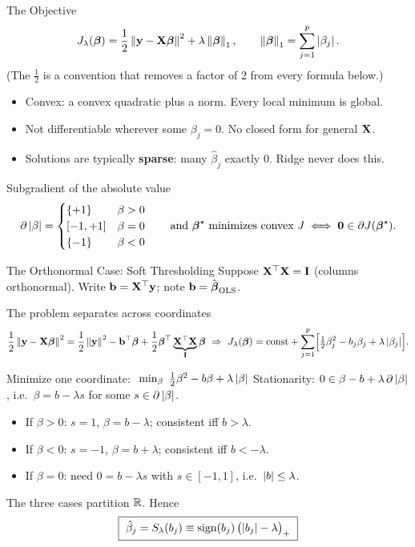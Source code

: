\documentclass[11pt,aspectratio=169]{beamer}
\begin{document}
\begin{frame}{The Objective}
\[
J_\lambda(\boldsymbol{\beta})=\frac12\left\lVert \mathbf{y}-\mathbf{X}\boldsymbol{\beta} \right\rVert^2+\lambda\left\lVert \boldsymbol{\beta} \right\rVert_1,\qquad\left\lVert \boldsymbol{\beta} \right\rVert_1=\sum_{j=1}^p\left\lvert \beta_j \right\rvert.
\]
(The $\tfrac12$ is a convention that removes a factor of 2 from every formula below.)
\begin{itemize}
  \item Convex: a convex quadratic plus a norm. Every local minimum is global.
  \item Not differentiable wherever some $\beta_j=0$. No closed form for general $\mathbf{X}$.
  \item Solutions are typically \textbf{sparse}: many $\hat\beta_j$ exactly $0$. Ridge never does this.
\end{itemize}
\begin{block}{Subgradient of the absolute value}
\[
\partial\left\lvert \beta \right\rvert=\begin{cases}\{+1\} & \beta>0\\ [-1,+1] & \beta=0\\ \{-1\} & \beta<0\end{cases}
\qquad\text{and }\boldsymbol{\beta}^\star\text{ minimizes convex }J\iff\mathbf{0}\in\partial J(\boldsymbol{\beta}^\star).
\]
\end{block}
\end{frame}

\begin{frame}{The Orthonormal Case: Soft Thresholding}\footnotesize
Suppose $\mathbf{X}^{\top}\mathbf{X}=\mathbf{I}$ (columns orthonormal). Write $\mathbf{b}=\mathbf{X}^{\top}\mathbf{y}$; note $\mathbf{b}=\hat{\boldsymbol{\beta}}_{\text{OLS}}$.
\begin{derivation}{The problem separates across coordinates}
\[
\frac12\left\lVert \mathbf{y}-\mathbf{X}\boldsymbol{\beta} \right\rVert^2=\frac12\left\lVert \mathbf{y} \right\rVert^2-\mathbf{b}^{\top}\boldsymbol{\beta}+\frac12\boldsymbol{\beta}^{\top}\underbrace{\mathbf{X}^{\top}\mathbf{X}}_{\mathbf{I}}\boldsymbol{\beta}
\ \Rightarrow\
J_\lambda(\boldsymbol{\beta})=\text{const}+\sum_{j=1}^p\Bigl[\tfrac12\beta_j^2-b_j\beta_j+\lambda\left\lvert \beta_j \right\rvert\Bigr].
\]
\end{derivation}
\begin{derivation}{Minimize one coordinate: $\ \min_\beta\ \tfrac12\beta^2-b\beta+\lambda\abs\beta$}
Stationarity: $0\in\beta-b+\lambda\,\partial\left\lvert \beta \right\rvert$, i.e.\ $\beta=b-\lambda s$ for some $s\in\partial\left\lvert \beta \right\rvert$.
\begin{itemize}
  \item If $\beta>0$: $s=1$, $\beta=b-\lambda$; consistent iff $b>\lambda$.
  \item If $\beta<0$: $s=-1$, $\beta=b+\lambda$; consistent iff $b<-\lambda$.
  \item If $\beta=0$: need $0=b-\lambda s$ with $s\in[-1,1]$, i.e.\ $\left\lvert b \right\rvert\le\lambda$.
\end{itemize}
The three cases partition $\mathbb{R}$. Hence
\[
\boxed{\ \hat\beta_j=S_\lambda(b_j)\equiv\sign(b_j)\,\bigl(\abs{b_j}-\lambda\bigr)_+\ }
\]
\end{derivation}
\end{frame}
\end{document}
